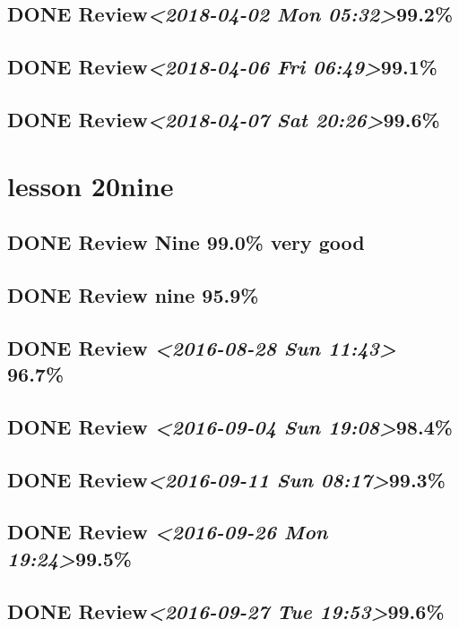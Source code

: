 \documentclass[11pt]{ctexart}
\begin{document}
\subsection{{\bfseries\sffamily DONE} Review\textit{<2018-04-02 Mon 05:32>}99.2\%}
\label{sec:orgd14c400}
\subsection{{\bfseries\sffamily DONE} Review\textit{<2018-04-06 Fri 06:49>}99.1\%}
\label{sec:orgfd4e4bd}
\subsection{{\bfseries\sffamily DONE} Review\textit{<2018-04-07 Sat 20:26>}99.6\%}
\label{sec:orge4d7d1b}
\section{lesson 20nine}
\label{sec:org9d5e343}
\subsection{{\bfseries\sffamily DONE} Review Nine 99.0\% very good}
\label{sec:orgf9bbc07}
\subsection{{\bfseries\sffamily DONE} Review nine 95.9\%}
\label{sec:org5891d34}
\subsection{{\bfseries\sffamily DONE} Review \textit{<2016-08-28 Sun 11:43> } 96.7\%}
\label{sec:org3977242}
\subsection{{\bfseries\sffamily DONE} Review \textit{<2016-09-04 Sun 19:08>}98.4\%}
\label{sec:orgcdaa51c}
\subsection{{\bfseries\sffamily DONE} Review\textit{<2016-09-11 Sun 08:17>}99.3\%}
\label{sec:orga8e0e8f}
\subsection{{\bfseries\sffamily DONE} Review \textit{<2016-09-26 Mon 19:24>}99.5\%}
\label{sec:org0db6820}
\subsection{{\bfseries\sffamily DONE} Review\textit{<2016-09-27 Tue 19:53>}99.6\%}
\label{sec:orga495ebc}
\end{document}
